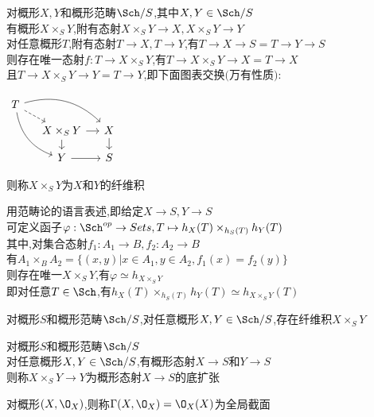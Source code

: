 \begin{dingyi}
对概形$X,Y$和概形范畴$\Sch/S$,其中$X,Y\in\Sch/S$\\
有概形$X\times_{S}Y$,附有态射$X\times_{S}Y\to X,X\times_{S}Y\to Y$\\
对任意概形$T$,附有态射$T\to X,T\to Y$,有$T\to X\to S=T\to Y\to S$\\
则存在唯一态射$f:T\to X\times_{S}Y$,有$T\to X\times_{S}Y\to X=T\to X$\\
且$T\to X\times_{S}Y\to Y=T\to Y$,即下面图表交换$($万有性质$)$:
\begin{center}
    $\begin{tikzcd}[column sep=small, row sep=small]
    T \ar[dr,dashed] \ar[drr,bend left] \ar[ddr,bend right] & & \\
    & X\times_{S}Y \ar[r] \ar[d] & X \ar[d]\\
    & Y \ar[r] & S 
    \end{tikzcd}$
\end{center}
则称$X\times_{S}Y$为$X$和$Y$的纤维积
\end{dingyi}

\begin{zhu}
用范畴论的语言表述,即给定$X\to S,Y\to S$\\
可定义函子$\varphi:\Sch^{op}\to Sets,T\mapsto h_{X}(T)\times_{h_{S}(T)}h_{Y}(T)$\\
其中,对集合态射$f_1:A_1\to B,f_2:A_2\to B$\\
有$A_1\times_{B}A_2=\{(x,y)|x\in A_1,y\in A_2,f_1(x)=f_2(y)\}$\\
则存在唯一$X\times_{S}Y$,有$\varphi\simeq h_{X\times_{S}Y}$\\
即对任意$T\in \Sch$,有$h_{X}(T)\times_{h_{S}(T)}h_{Y}(T)\simeq h_{X\times_{S}Y}(T)$
\end{zhu}

\begin{dingli}
对概形$S$和概形范畴$\Sch/S$,对任意概形$X,Y\in \Sch/S$,存在纤维积$X\times_{S}Y$
\end{dingli}

\begin{dingyi}
对概形$S$和概形范畴$\Sch/S$\\
对任意概形$X,Y\in \Sch/S$,有概形态射$X\to S$和$Y\to S$\\
则称$X\times_{S}Y\to Y$为概形态射$X\to S$的底扩张
\end{dingyi}

\begin{dingyi}
对概形$(X,\O_{X})$,则称$\Gamma(X,\O_{X})=\O_{X}(X)$为全局截面
\end{dingyi}

